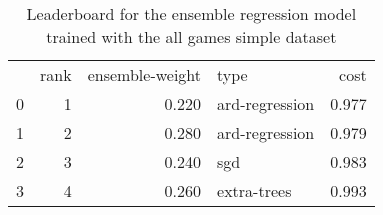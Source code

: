 \begin{table}[]
	\centering
	\begin{tabular}{lrrlr}
		  & rank & ensemble-weight & type           & cost  \\
		0 & 1    & 0.220           & ard-regression & 0.977 \\
		1 & 2    & 0.280           & ard-regression & 0.979 \\
		2 & 3    & 0.240           & sgd            & 0.983 \\
		3 & 4    & 0.260           & extra-trees    & 0.993 \\
	\end{tabular}

	\caption{Leaderboard for the ensemble regression model trained with the all games simple dataset}
	\label{tab:lb-reg-all-games-simple-v2}
\end{table}
